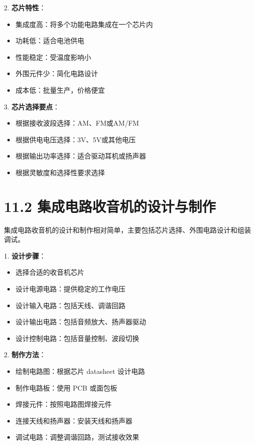 \documentclass[12pt,UTF8]{ctexbook}
\begin{document}
2. \textbf{芯片特性}：
   \begin{itemize}[leftmargin=3.5em]
   \item 集成度高：将多个功能电路集成在一个芯片内
   \item 功耗低：适合电池供电
   \item 性能稳定：受温度影响小
   \item 外围元件少：简化电路设计
   \item 成本低：批量生产，价格便宜
   \end{itemize}

3. \textbf{芯片选择要点}：
   \begin{itemize}[leftmargin=3.5em]
   \item 根据接收波段选择：AM、FM或AM/FM
   \item 根据供电电压选择：3V、5V或其他电压
   \item 根据输出功率选择：适合驱动耳机或扬声器
   \item 根据灵敏度和选择性要求选择
   \end{itemize}

\section*{11.2 集成电路收音机的设计与制作}

集成电路收音机的设计和制作相对简单，主要包括芯片选择、外围电路设计和组装调试。

1. \textbf{设计步骤}：
   \begin{itemize}[leftmargin=3.5em]
   \item 选择合适的收音机芯片
   \item 设计电源电路：提供稳定的工作电压
   \item 设计输入电路：包括天线、调谐回路
   \item 设计输出电路：包括音频放大、扬声器驱动
   \item 设计控制电路：包括音量控制、波段切换
   \end{itemize}

2. \textbf{制作方法}：
   \begin{itemize}[leftmargin=3.5em]
   \item 绘制电路图：根据芯片 datasheet 设计电路
   \item 制作电路板：使用 PCB 或面包板
   \item 焊接元件：按照电路图焊接元件
   \item 连接天线和扬声器：安装天线和扬声器
   \item 调试电路：调整调谐回路，测试接收效果
   \end{itemize}
\end{document}
